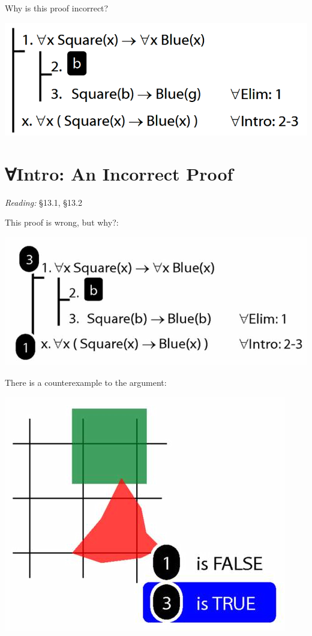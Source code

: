 \documentclass[12pt]{extarticle}
\begin{document}
\begin{multicols*}{3}
\begin{minipage}{\columnwidth}
Why is this proof incorrect?
 
\begin{center}
\includegraphics[scale=0.3]{img/proof_universal_intro_incorrect.png}
\end{center}
\end{minipage}
 
 
 
\section{∀Intro: An Incorrect Proof}
 
\emph{Reading:} §13.1, §13.2
 
This proof is wrong, but why?:
 
\begin{center}
\includegraphics[scale=0.3]{img/unit_572_proof.png}
\end{center}
There is a counterexample to the argument:
 
\begin{center}
\includegraphics[scale=0.3]{img/unit_572_proof2.png}
\end{center}
\vfill




\end{multicols*}
\end{document}

